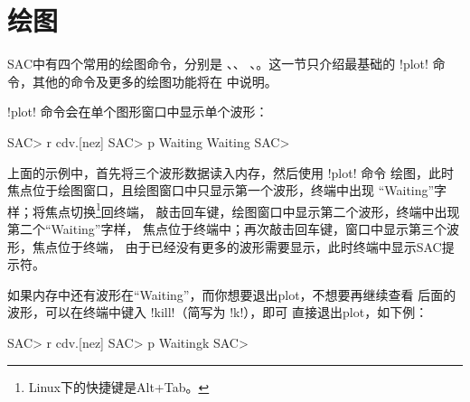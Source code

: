 \section{绘图}
\label{sec:display}

SAC中有四个常用的绘图命令，分别是 、、
、。这一节只介绍最基础的
!plot! 命令，其他的命令及更多的绘图功能将在
 中说明。

!plot! 命令会在单个图形窗口中显示单个波形：
\begin{SACCode}
SAC> r cdv.[nez]
SAC> p
Waiting
Waiting
SAC>
\end{SACCode}

上面的示例中，首先将三个波形数据读入内存，然后使用 !plot! 命令
绘图，此时焦点位于绘图窗口，且绘图窗口中只显示第一个波形，终端中出现
``Waiting''字样；将焦点切换\footnote{Linux下的快捷键是Alt+Tab。}回终端，
敲击回车键，绘图窗口中显示第二个波形，终端中出现第二个``Waiting''字样，
焦点位于终端中；再次敲击回车键，窗口中显示第三个波形，焦点位于终端，
由于已经没有更多的波形需要显示，此时终端中显示SAC提示符。

如果内存中还有波形在``Waiting''，而你想要退出plot，不想要再继续查看
后面的波形，可以在终端中键入 !kill!（简写为 !k!），即可
直接退出plot，如下例：
\begin{SACCode}
SAC> r cdv.[nez]
SAC> p
Waitingk
SAC>
\end{SACCode}

